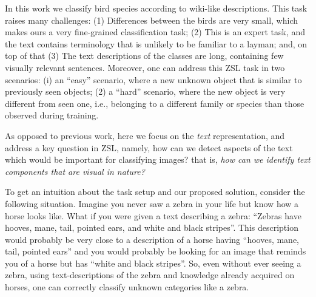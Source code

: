 \documentclass[11pt,a4paper]{article}
\newcommand\gal[1]{\textcolor{bright}{\textbf{GAL:} #1 }}
\newcommand\tzuf[1]{\textcolor{blue}{\textbf{TZUF:} #1 }}
\begin{document}
In this work we classify bird species according to wiki-like descriptions.
This task raises many challenges: 
(1) Differences between the birds are very small, which makes ours a very fine-grained classification task; (2) This is an expert task, %
and the text contains terminology that is unlikely to be familiar to a layman; and, on top of that
(3) The text descriptions of the classes are long, containing few visually relevant sentences. 
Moreover, one can address this ZSL  task in two scenarios: %
(i) an \enquote{easy} scenario, where  a new unknown object that is similar to  previously seen objects; (2) a \enquote{hard} scenario, where the new object is very different from seen one, i.e., belonging to a different family or species than those observed during training.


As opposed to previous work,  here we focus on the {\em text} representation, and address a key question in ZSL, namely, how can we detect aspects of the text which would be important for classifying images? that is, \textit {how can we identify text components that are visual in nature?}


To get an intuition about the task setup and our proposed solution, consider the following situation.
Imagine you never saw a zebra in your life but know how a horse looks like. What if you were given a text describing a zebra: \enquote{Zebras have hooves, mane, tail, pointed ears, and white and black stripes}. This description would probably be very close to a description of a horse having \enquote{hooves, mane, tail, pointed ears} and you would probably be looking for an image that reminds you of a horse but has \enquote{white and black stripes}. So, even without ever seeing a zebra, using text-descriptions of the zebra and  knowledge already acquired on horses, one can correctly classify unknown categories like a zebra.
\end{document}

